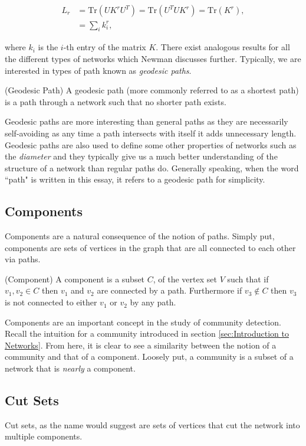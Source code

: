 $$
\begin{aligned}
    L_r &= \text{Tr}(UK^rU^T) = \text{Tr}(U^TUK^r) = \text{Tr}(K^r), \\
    & = \sum_i k_i^r,
\end{aligned}
$$

where $k_i$ is the $i$-th entry of the matrix $K$. There exist analogous results for all the different types of networks which Newman discusses further\cite[138]{newman10}. Typically, we are interested in types of path known as \emph{geodesic paths}.

\begin{definition}{(Geodesic Path)}
    A geodesic path (more commonly referred to as a shortest path) is a path through a network such that no shorter path exists.
\end{definition}

Geodesic paths are more interesting than general paths as they are necessarily self-avoiding as any time a path intersects with itself it adds unnecessary length. Geodesic paths are also used to define some other properties of networks such as the \emph{diameter} and they typically give us a much better understanding of the structure of a network than regular paths do. Generally speaking, when the word ``path" is written in this essay, it refers to a geodesic path for simplicity.

\subsection{Components}
Components are a natural consequence of the notion of paths. Simply put, components are sets of vertices in the graph that are all connected to each other via paths.

\begin{definition}{(Component)}
    A component is a subset $C$, of the vertex set $V$ such that if $v_1, v_2 \in C$ then $v_1$ and $v_2$ are connected by a path. Furthermore if $v_3 \not\in C$ then $v_3$ is not connected to either $v_1$ or $v_2$ by any path.
\end{definition}

Components are an important concept in the study of community detection. Recall the intuition for a community introduced in section \ref{sec:Introduction to Networks}. From here, it is clear to see a similarity between the notion of a community and that of a component. Loosely put, a community is a subset of a network that is \emph{nearly} a component.

\subsection{Cut Sets}
Cut sets, as the name would suggest are sets of vertices that cut the network into multiple components. 

